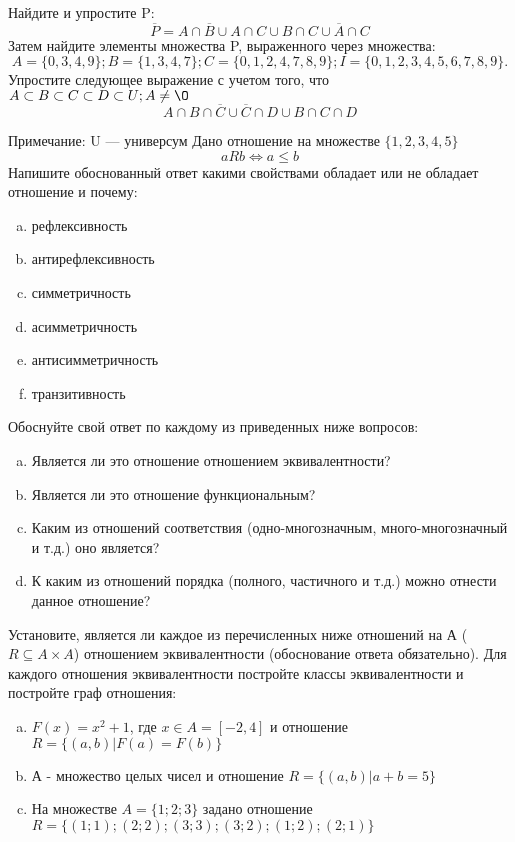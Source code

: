 \documentclass[10pt]{exam}
\begin{document}
\begin{questions}
\question
Найдите и упростите P:
\begin{equation*}
\overline{P} = A \cap \overline{B} \cup A \cap C \cup B \cap C \cup \overline{A} \cap C
\end{equation*}
Затем найдите элементы множества P, выраженного через множества:
\begin{equation*}
A = \{0, 3, 4, 9\}; 
B = \{1, 3, 4, 7\};
C = \{0, 1, 2, 4, 7, 8, 9\};
I = \{0, 1, 2, 3, 4, 5, 6, 7, 8, 9\}.
\end{equation*}\question
Упростите следующее выражение с учетом того, что $A\subset B \subset C \subset D \subset U; A \neq \O$
\begin{equation*}
A \cap B  \cap \overline{C} \cup \overline{C} \cap D \cup B \cap C \cap D
\end{equation*}

Примечание: U — универсум\question
Дано отношение на множестве $\{1, 2, 3, 4, 5\}$ 
\begin{equation*}
aRb \iff a \leq b
\end{equation*}
Напишите обоснованный ответ какими свойствами обладает или не обладает отношение и почему:   
\begin{enumerate} [a)]\setcounter{enumi}{0}
\item рефлексивность
\item антирефлексивность
\item симметричность
\item асимметричность
\item антисимметричность
\item транзитивность
\end{enumerate}

Обоснуйте свой ответ по каждому из приведенных ниже вопросов:
\begin{enumerate} [a)]\setcounter{enumi}{0}
    \item Является ли это отношение отношением эквивалентности?
    \item Является ли это отношение функциональным?
    \item Каким из отношений соответствия (одно-многозначным, много-многозначный и т.д.) оно является?
    \item К каким из отношений порядка (полного, частичного и т.д.) можно отнести данное отношение?
\end{enumerate}


\question
Установите, является ли каждое из перечисленных ниже отношений на А ($R \subseteq A \times A$) отношением эквивалентности (обоснование ответа обязательно). Для каждого отношения эквивалентности постройте классы эквивалентности и постройте граф отношения:
\begin{enumerate} [a)]\setcounter{enumi}{0}
\item $F(x)=x^{2}+1$, где $x \in A = [-2, 4]$ и отношение $R = \{(a,b)|F(a) = F(b)\}$
\item А - множество целых чисел и отношение $R = \{(a,b)|a + b = 5\}$
\item На множестве $A = \{1; 2; 3\}$ задано отношение $R = \{(1; 1); (2; 2); (3; 3); (3; 2); (1; 2); (2; 1)\}$


\end{enumerate}
\end{questions}
\end{document}
